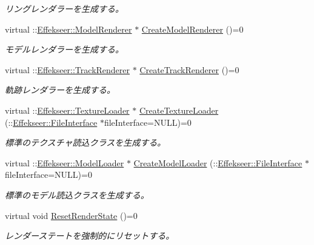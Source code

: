 \begin{DoxyCompactItemize}
\begin{DoxyCompactList}\small\item\em リングレンダラーを生成する。 \end{DoxyCompactList}\item 
virtual \+::\mbox{\hyperlink{class_effekseer_1_1_model_renderer}{Effekseer\+::\+Model\+Renderer}} $\ast$ \mbox{\hyperlink{class_effekseer_renderer_1_1_renderer_a7cbbeb73fa35b6cf356fcef7499301fb}{Create\+Model\+Renderer}} ()=0
\begin{DoxyCompactList}\small\item\em モデルレンダラーを生成する。 \end{DoxyCompactList}\item 
virtual \+::\mbox{\hyperlink{class_effekseer_1_1_track_renderer}{Effekseer\+::\+Track\+Renderer}} $\ast$ \mbox{\hyperlink{class_effekseer_renderer_1_1_renderer_a38cff31386fce6fe0122a4ac5804fd8f}{Create\+Track\+Renderer}} ()=0
\begin{DoxyCompactList}\small\item\em 軌跡レンダラーを生成する。 \end{DoxyCompactList}\item 
virtual \+::\mbox{\hyperlink{class_effekseer_1_1_texture_loader}{Effekseer\+::\+Texture\+Loader}} $\ast$ \mbox{\hyperlink{class_effekseer_renderer_1_1_renderer_a13e29065eaca81d5191d9bad1421c408}{Create\+Texture\+Loader}} (\+::\mbox{\hyperlink{class_effekseer_1_1_file_interface}{Effekseer\+::\+File\+Interface}} $\ast$file\+Interface=N\+U\+LL)=0
\begin{DoxyCompactList}\small\item\em 標準のテクスチャ読込クラスを生成する。 \end{DoxyCompactList}\item 
virtual \+::\mbox{\hyperlink{class_effekseer_1_1_model_loader}{Effekseer\+::\+Model\+Loader}} $\ast$ \mbox{\hyperlink{class_effekseer_renderer_1_1_renderer_ab35779830c25992af7a9a9d53423f817}{Create\+Model\+Loader}} (\+::\mbox{\hyperlink{class_effekseer_1_1_file_interface}{Effekseer\+::\+File\+Interface}} $\ast$file\+Interface=N\+U\+LL)=0
\begin{DoxyCompactList}\small\item\em 標準のモデル読込クラスを生成する。 \end{DoxyCompactList}\item 
virtual void \mbox{\hyperlink{class_effekseer_renderer_1_1_renderer_a229d0aca027c72e6736db487efbbddeb}{Reset\+Render\+State}} ()=0
\begin{DoxyCompactList}\small\item\em レンダーステートを強制的にリセットする。 \end{DoxyCompactList}\item 

\end{DoxyCompactItemize}
